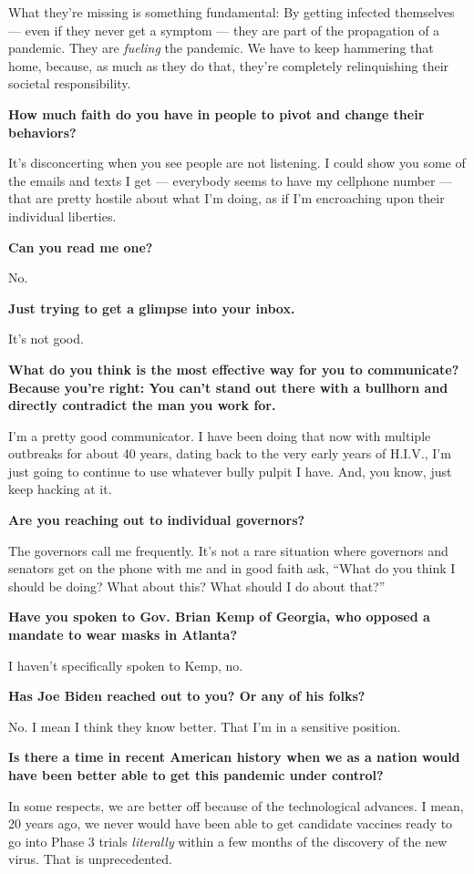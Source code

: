 What they're missing is something fundamental: By getting infected
themselves --- even if they never get a symptom --- they are part of the
propagation of a pandemic. They are \emph{fueling} the pandemic. We have
to keep hammering that home, because, as much as they do that, they're
completely relinquishing their societal responsibility.

\textbf{How much faith do you have in people to pivot and change their
behaviors?}

It's disconcerting when you see people are not listening. I could show
you some of the emails and texts I get --- everybody seems to have my
cellphone number --- that are pretty hostile about what I'm doing, as if
I'm encroaching upon their individual liberties.

\textbf{Can you read me one?}

No.

\textbf{Just trying to get a glimpse into your inbox.}

It's not good.

\textbf{What do you think is the most effective way for you to
communicate? Because you're right: You can't stand out there with a
bullhorn and directly contradict the man you work for.}

I'm a pretty good communicator. I have been doing that now with multiple
outbreaks for about 40 years, dating back to the very early years of
H.I.V., I'm just going to continue to use whatever bully pulpit I have.
And, you know, just keep hacking at it.

\textbf{Are you reaching out to individual governors?}

The governors call me frequently. It's not a rare situation where
governors and senators get on the phone with me and in good faith ask,
``What do you think I should be doing? What about this? What should I do
about that?''

\textbf{Have you spoken to Gov. Brian Kemp of Georgia, who opposed a
mandate to wear masks in Atlanta?}

I haven't specifically spoken to Kemp, no.

\textbf{Has Joe Biden reached out to you? Or any of his folks?}

No. I mean I think they know better. That I'm in a sensitive position.

\textbf{Is there a time in recent American history when we as a nation
would have been better able to get this pandemic under control?}

In some respects, we are better off because of the technological
advances. I mean, 20 years ago, we never would have been able to get
candidate vaccines ready to go into Phase 3 trials \emph{literally}
within a few months of the discovery of the new virus. That is
unprecedented.

